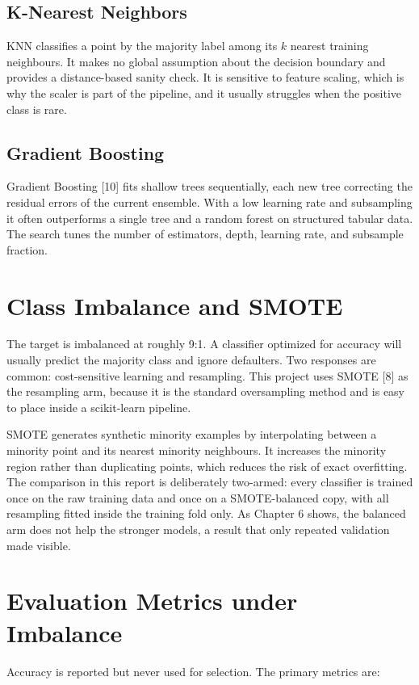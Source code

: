 \subsection{K-Nearest Neighbors}
KNN classifies a point by the majority label among its $k$ nearest training neighbours. It makes no global assumption about the decision boundary and provides a distance-based sanity check. It is sensitive to feature scaling, which is why the scaler is part of the pipeline, and it usually struggles when the positive class is rare.

\subsection{Gradient Boosting}
Gradient Boosting [10] fits shallow trees sequentially, each new tree correcting the residual errors of the current ensemble. With a low learning rate and subsampling it often outperforms a single tree and a random forest on structured tabular data. The search tunes the number of estimators, depth, learning rate, and subsample fraction.

\section{Class Imbalance and SMOTE}
The target is imbalanced at roughly 9:1. A classifier optimized for accuracy will usually predict the majority class and ignore defaulters. Two responses are common: cost-sensitive learning and resampling. This project uses SMOTE [8] as the resampling arm, because it is the standard oversampling method and is easy to place inside a scikit-learn pipeline.

SMOTE generates synthetic minority examples by interpolating between a minority point and its nearest minority neighbours. It increases the minority region rather than duplicating points, which reduces the risk of exact overfitting. The comparison in this report is deliberately two-armed: every classifier is trained once on the raw training data and once on a SMOTE-balanced copy, with all resampling fitted inside the training fold only. As Chapter 6 shows, the balanced arm does not help the stronger models, a result that only repeated validation made visible.

\section{Evaluation Metrics under Imbalance}
Accuracy is reported but never used for selection. The primary metrics are:

